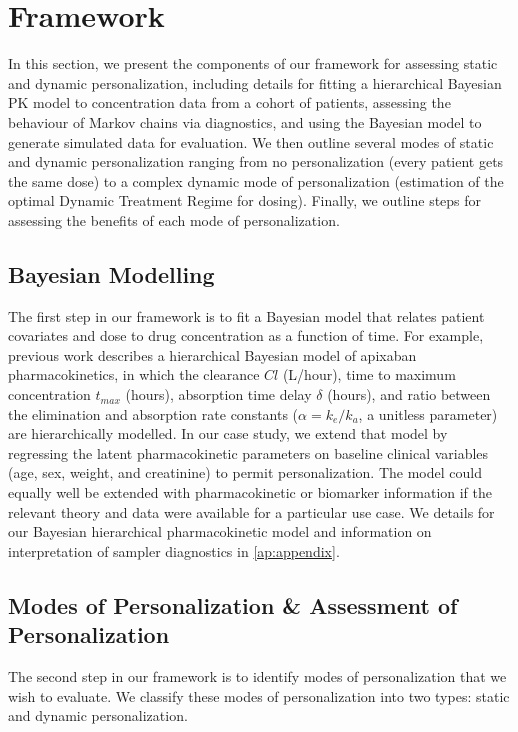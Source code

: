 \section{Framework}\label{ss:framework}

In this section, we present the components of our framework for assessing static and dynamic personalization, including details for fitting a hierarchical Bayesian PK model to concentration data from a cohort of patients, assessing the behaviour of Markov chains via diagnostics, and using the Bayesian model to generate simulated data for evaluation. We then outline several modes of static and dynamic personalization ranging from no personalization (every patient gets the same dose) to a complex dynamic mode of personalization (estimation of the optimal Dynamic Treatment Regime for dosing).  Finally, we outline steps for assessing the benefits of each mode of personalization.

\subsection{Bayesian Modelling}

The first step in our framework is to fit a Bayesian model that relates patient covariates and dose to drug concentration as a function of time. For example, previous work \cite{pananos2020comparisons} describes a hierarchical Bayesian model of apixaban pharmacokinetics, in which the clearance $Cl$ (L/hour), time to maximum concentration $t_{max}$ (hours), absorption time delay $\delta$ (hours), and ratio between the elimination and absorption rate constants ($\alpha = k_e/k_a$, a unitless parameter) are hierarchically modelled. In our case study, we extend that model by regressing the latent pharmacokinetic parameters on baseline clinical variables (age, sex, weight, and creatinine) to permit personalization. The model could equally well be extended with pharmacokinetic or biomarker information if the relevant theory and data were available for a particular use case. We details for our Bayesian hierarchical pharmacokinetic model and information on interpretation of sampler diagnostics in \cref{ap:appendix}.


\subsection{Modes of Personalization \& Assessment of Personalization}

The second step in our framework is to identify modes of personalization that we wish to evaluate. We classify these modes of personalization into two types: static and dynamic personalization.

